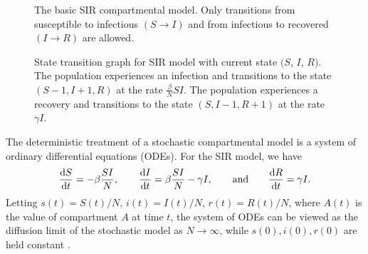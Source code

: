 \begin{figure}
    \centering
    \caption[The basic SIR compartmental model.]{The basic SIR compartmental model.
    Only transitions from susceptible to infectious \( (S \to I) \) and from infectious to recovered \( (I \to R) \) are allowed.}
    \label{ch_2:fig:SIR_diagram}
\end{figure}

\begin{figure}
    \centering
    \caption[State transition graph for SIR model.]{State transition graph for SIR model with current state \( (S \), \( I \),  \( R) \).
    The population experiences an infection and transitions to the state \( (S-1, I+1, R) \) at the rate \( \frac{\beta}{N}SI \).
    The population experiences a recovery and transitions to the state \( (S, I-1, R+1) \) at the rate \( \gamma I \).
    }
    \label{ch_2:fig:stocastic_SIR}
\end{figure}

The deterministic treatment of a stochastic compartmental model is a system of ordinary differential equations (ODEs).
For the SIR model, we have 
\begin{equation}
    \frac{\mathrm{d} S}{\mathrm{d} t} = -\beta \frac{SI}{N}, \qquad
    \frac{\mathrm{d} I}{\mathrm{d} t} = \beta \frac{SI}{N} - \gamma I, \qquad
    \text{and} \qquad
    \frac{\mathrm{d} R}{\mathrm{d} t} = \gamma I
    \text{.}
\label{ch_2:SIR_diff_eq}
\end{equation}
Letting \( s(t) = S(t) / N \), \( i(t) = I(t) / N \), \( r(t) = R(t) / N \), where \( A(t) \) is the value of compartment \( A \) at time \( t \), the system of ODEs can be viewed as the diffusion limit of the stochastic model as \( N \to \infty \), while \( s(0), i(0), r(0) \) are held constant \citep{Greenwood2009, fuchs2013inference}.


